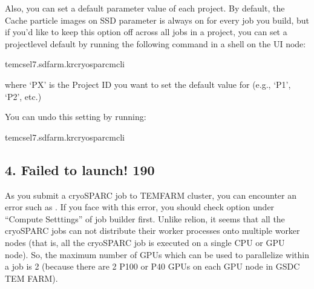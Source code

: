\documentclass[a4paper,11pt,english]{sphinxmanual}
\begin{document}
\sphinxAtStartPar
Also, you can set a default parameter value of each project. By default, the Cache particle images on SSD parameter is always on for every job you build,
but if you’d like to keep this option off across all jobs in a project, you can set a project\sphinxhyphen{}level default by running the following command in a shell on the UI node:

\begin{sphinxVerbatim}[commandchars=\\\{\}]
tem\PYGZhy{}cs\PYGZhy{}el7.sdfarm.kr\PYGZdl{}\PYGZgt{}cryosparcmcli
\end{sphinxVerbatim}

\sphinxAtStartPar
where ‘PX’ is the Project ID you want to set the default value for (e.g., ‘P1’, ‘P2’, etc.)

\sphinxAtStartPar
You can undo this setting by running:

\begin{sphinxVerbatim}[commandchars=\\\{\}]
tem\PYGZhy{}cs\PYGZhy{}el7.sdfarm.kr\PYGZdl{}\PYGZgt{}cryosparcmcli
\end{sphinxVerbatim}


\subsection{4. Failed to launch! 190}
\label{\detokenize{cryoSPARC:failed-to-launch-190}}
\sphinxAtStartPar
As you submit a cryoSPARC job to TEM\sphinxhyphen{}FARM cluster, you can encounter an error such as .
If you face with this error, you should check  option under “Compute Setttings” of job builder first.
Unlike relion, it seems that all the cryoSPARC jobs can not distribute their worker processes onto multiple worker nodes
(that is, all the cryoSPARC job is executed on a single CPU or GPU node).
So, the maximum number of GPUs which can be used to parallelize within a job is 2 (because there are 2 P100 or P40 GPUs on each GPU node in GSDC TEM FARM).

\end{document}
